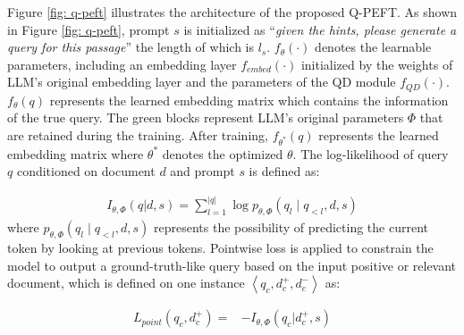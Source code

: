 \documentclass[sigconf,natbib=true,anonymous=false]{acmart}
\begin{document}
Figure \ref{fig: q-peft} illustrates the architecture of the proposed Q-PEFT. As shown in Figure \ref{fig: q-peft}, prompt $s$ is initialized as ``\textit{given the hints, please generate a query for this passage}'' the length of which is $l_{s}$. $f_{\theta}(\cdot)$ denotes the learnable parameters, including an embedding layer $f_{embed}(\cdot)$ initialized by the weights of LLM's original embedding layer and the parameters of the QD module $f_{QD}(\cdot)$. $f_{\theta}(q)$ represents the learned embedding matrix which contains the information of the true query. The green blocks represent LLM's original parameters $\Phi$ that are retained during the training. After training, $f_{\theta^{*}}(q)$ represents the learned embedding matrix where $\theta^{*}$ denotes the optimized $\theta$. The log-likelihood of query $q$ conditioned on document $d$ and prompt $s$ is defined as:

\begin{equation}
\begin{aligned}
I_{\theta, \Phi}(q| d, s)= \sum_{l=1}^{|q|} \log p_{\theta, \Phi}\left(q_{l} \mid q_{<l}, d, s\right)
\end{aligned}
\label{eq: log-likelihood}
\end{equation}
where $p_{\theta, \Phi}\left(q_{l} \mid q_{<l}, d, s\right)$ represents the possibility of predicting the current token by looking at previous tokens. Pointwise loss is applied to constrain the model to output a ground-truth-like query based on the input positive or relevant document, which is defined on one instance $\left\langle q_c, d_c^{+}, d_{c}^{-}\right\rangle$ as:

\begin{equation}
\begin{aligned}
L_{point}(q_{c}, d_{c}^{+})= & - I_{\theta, \Phi}(q_{c}| d_{c}^{+}, s)
\end{aligned}
\label{eq: poinwise}
\end{equation}
\end{document}

